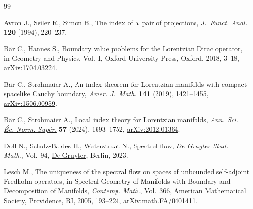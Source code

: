 \begin{thebibliography}{99}
\footnotesize\itemsep=0pt

Avron J., Seiler R., Simon B., The index of a~pair of projections,
  \href{https://doi.org/10.1006/jfan.1994.1031}{\textit{J.~Funct. Anal.}}
  \textbf{120} (1994), 220--237.

B\"ar C., Hannes S., Boundary value problems for the {L}orentzian {D}irac
  operator, in Geometry and Physics. {V}ol.~{I}, Oxford University Press,
  Oxford, 2018, 3--18,
  \href{http://arxiv.org/abs/1704.03224}{arXiv:1704.03224}.

B\"ar C., Strohmaier A., An index theorem for {L}orentzian manifolds with
  compact spacelike {C}auchy boundary,
  \href{https://doi.org/10.1353/ajm.2019.0037}{\textit{Amer. J.~Math.}}
  \textbf{141} (2019), 1421--1455,
  \href{http://arxiv.org/abs/1506.00959}{arXiv:1506.00959}.

B\"ar C., Strohmaier A., Local index theory for {L}orentzian manifolds,
  \href{https://doi.org/10.24033/asens.2597}{\textit{Ann. Sci. \'Ec. Norm.
  Sup\'er.}} \textbf{57} (2024), 1693--1752,
  \href{http://arxiv.org/abs/2012.01364}{arXiv:2012.01364}.

Doll N., Schulz-Baldes H., Waterstraat N., Spectral flow, \textit{De Gruyter
  Stud. Math.}, Vol.~94, \href{https://doi.org/10.1515/9783111172477}{De
  Gruyter}, Berlin, 2023.

Lesch M., The uniqueness of the spectral flow on spaces of unbounded
  self-adjoint {F}redholm operators, in Spectral Geometry of Manifolds with
  Boundary and Decomposition of Manifolds, \textit{Contemp. Math.}, Vol.~366,
  \href{https://doi.org/10.1090/conm/366/06730}{American Mathematical Society},
  Providence, RI, 2005, 193--224,
  \href{http://arxiv.org/abs/math.FA/0401411}{arXiv:math.FA/0401411}.

\end{thebibliography}
